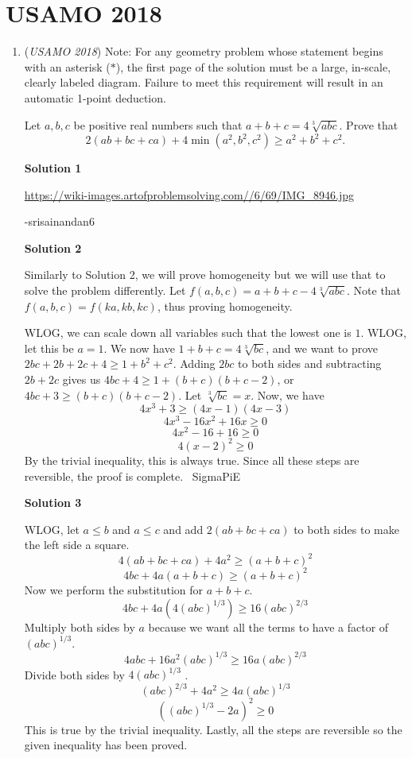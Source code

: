 \section{USAMO 2018}
        \begin{enumerate}
        	\item (\textit{USAMO 2018}) Note: For any geometry problem whose statement begins with an asterisk ($*$), the first page of the solution must be a large, in-scale, clearly labeled diagram. Failure to meet this requirement will result in an automatic 1-point deduction.


 Let $a,b,c$ be positive real numbers such that $a+b+c=4\sqrt[3]{abc}$. Prove that 
 \[2(ab+bc+ca)+4\min(a^2,b^2,c^2)\ge a^2+b^2+c^2.\]




\textbf{Solution 1}

\href{https://wiki-images.artofproblemsolving.com//6/69/IMG\_8946.jpg}{https://wiki-images.artofproblemsolving.com//6/69/IMG\_8946.jpg}

 -srisainandan6

 



\textbf{Solution 2}

Similarly to Solution 2, we will prove homogeneity but we will use that to solve the problem differently. Let $f(a,b,c)=a+b+c-4\sqrt[3]{abc}$. Note that $f(a,b,c)=f(ka,kb,kc)$, thus proving homogeneity. 

 WLOG, we can scale down all variables such that the lowest one is $1$. WLOG, let this be $a=1$. We now have $1+b+c=4\sqrt[3]{bc}$, and we want to prove $2bc+2b+2c+4\ge 1+b^2+c^2.$ Adding $2bc$ to both sides and subtracting $2b+2c$ gives us $4bc+4\ge 1+ (b+c)(b+c-2)$, or $4bc+3\ge (b+c)(b+c-2)$. Let $\sqrt[3]{bc}=x$. Now, we have 
 \[4x^3+3 \ge (4x-1)(4x-3)\] 
 \[4x^3 - 16x^2 + 16x \ge 0\] 
 \[4x^2 - 16 + 16 \ge 0\] 
 \[4(x-2)^2 \ge 0\] By the trivial inequality, this is always true. Since all these steps are reversible, the proof is complete. ~SigmaPiE

 



\textbf{Solution 3}

WLOG, let $a \le b$ and $a \le c$ and add $2(ab+bc+ca)$ to both sides to make the left side a square.
 \[4(ab+bc+ca)+4a^2 \ge (a+b+c)^2\] 
 \[4bc+4a(a+b+c) \ge (a+b+c)^2\] Now we perform the substitution for $a+b+c$. 
 \[4bc+4a(4(abc)^{1/3}) \ge 16(abc)^{2/3}\] Multiply both sides by $a$ because we want all the terms to have a factor of $(abc)^{1/3}$. 
 \[4abc+16a^2(abc)^{1/3} \ge 16a(abc)^{2/3}\] Divide both sides by $4(abc)^{1/3}$ . 
 \[(abc)^{2/3}+4a^2 \ge 4a(abc)^{1/3}\] 
 \[((abc)^{1/3}-2a)^2 \ge 0\] This is true by the trivial inequality. Lastly, all the steps are reversible so the given inequality has been proved.


\end{enumerate}
